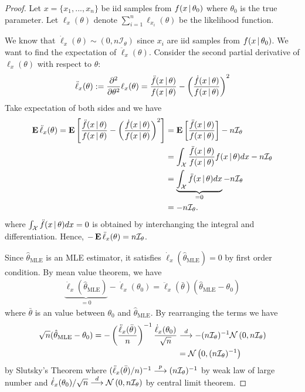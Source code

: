 \documentclass[a4paper,11pt]{article}
\begin{document}
\begin{proof}
	Let $x=\{x_1,...,x_n\}$ be iid samples from $f(x\,|\,\theta_0)$ where
	$\theta_0$ is the true parameter.
	Let $\ell_{x}(\theta)$ denote $\sum_{i=1}^{n}\ell_{x_i}(\theta)$ be
	the likelihood function.

	We know that $\dot\ell_{x}(\theta)\sim(0,n\mathcal{I}_{\theta})$
	since $x_i$ are iid samples from $f(x\,|\,\theta_0)$.
	We want to find the expectation of $\ddot\ell_{x}(\theta)$.
	Consider the second partial derivative of $\ell_{x}(\theta)$
	with respect to $\theta$:
	\begin{align*}
		\ddot\ell_{x}(\theta)
		:= \frac{\partial^2}{\partial\theta^2} \ell_{x}(\theta)
		= \frac{\ddot f(x\,|\,\theta)}{f(x\,|\,\theta)}
		- \left(\frac{\dot f(x\,|\,\theta)}{f(x\,|\,\theta)}\right)^2
	\end{align*}
	Take expectation of both sides and we have
	\begin{align*}
		\operatorname{\text{\textrm{\upshape\textbf{E}}}}{\ddot\ell_{x}(\theta)}
		= \operatorname{\text{\textrm{\upshape\textbf{E}}}}\left[ \frac{\ddot f(x\,|\,\theta)}{f(x\,|\,\theta)}
		- \left(\frac{\dot f(x\,|\,\theta)}{f(x\,|\,\theta)}\right)^2 \right]
		&= \operatorname{\text{\textrm{\upshape\textbf{E}}}}\left[\frac{\ddot f(x\,|\,\theta)}{f(x\,|\,\theta)}\right]
		- n\mathcal{I}_{\theta} \\
		&= \int_{\mathcal{X}}
		\frac{\ddot f(x\,|\,\theta)}{f(x\,|\,\theta)}f(x\,|\,\theta) d{x}
		- n\mathcal{I}_{\theta} \\
		&= \underbrace{\int_{\mathcal{X}} \ddot f(x\,|\,\theta) d{x}}_{=0}
		- n\mathcal{I}_{\theta} \\
		&= - n\mathcal{I}_{\theta}.
	\end{align*}
	where $\int_{\mathcal{X}}\ddot f(x\,|\,\theta)d{x}=0$ is obtained by
	interchanging the integral and differentiation.
	Hence, $-\operatorname{\text{\textrm{\upshape\textbf{E}}}}{\ddot\ell_{x}(\theta)}=n\mathcal{I}_{\theta}$.

	Since $\hat{\theta}_{\text{MLE}}$ is an MLE estimator, 
	it satisfies $\dot\ell_{x}(\hat{\theta}_{\text{MLE}})=0$ by first order condition.
	By mean value theorem, we have
	\begin{align*}
		\underbrace{\dot\ell_{x}(\hat{\theta}_{\text{MLE}})}_{=0}
		- \dot\ell_{x}(\theta_0)
		= \ddot\ell_{x}(\bar\theta)(\hat{\theta}_{\text{MLE}}-\theta_0)
	\end{align*}
	where $\bar{\theta}$ is an value between $\theta_0$ and $\hat{\theta}_{\text{MLE}}$.
	By rearranging the terms we have
	\begin{align*}
		\sqrt{n}(\hat{\theta}_{\text{MLE}}-\theta_0)
		= -\left(\frac{\ddot\ell_{x}(\bar\theta)}{n}\right)^{-1}
		\frac{\dot\ell_{x}(\theta_0)}{\sqrt{n}}
		&\overset{d}{\longrightarrow} -(n\mathcal{I}_{\theta})^{-1}\mathcal{N}\left(0,n\mathcal{I}_{\theta}\right) \\
		&= \mathcal{N}\left(0,(n\mathcal{I}_{\theta})^{-1}\right)
	\end{align*}
	by Slutsky's Theorem
	where $({\ddot\ell_{x}(\bar\theta)}/{n})^{-1}\overset{p}{\longrightarrow}(n\mathcal{I}_{\theta})^{-1}$
	by weak law of large number and
	${\dot\ell_{x}(\theta_0)}/{\sqrt{n}}\overset{d}{\longrightarrow}\mathcal{N}\left(0,n\mathcal{I}_{\theta}\right)$
	by central limit theorem.
\end{proof}
\end{document}
